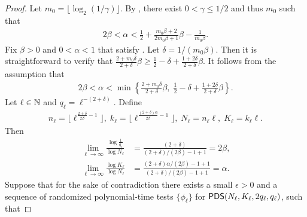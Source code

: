 	
	\begin{proof}
	  Let $m_0=\lfloor \log_2 (1/\gamma) \rfloor$.  By , there exist $0<\gamma \le 1/2$ and thus $m_0$ such that 
	     \begin{align}
    2\beta <\alpha <  \frac{1}{2} + \frac{m_0\beta+2}{2m_0\beta+1} \beta - \frac{1}{m_0 \beta}.   \label{eq:HardRegimeExpression}
    \end{align}
Fix $ \beta>0$ and $0<\alpha<1$ that satisfy . 
Let $\delta=1/(m_0 \beta)$. Then it is straightforward to verify that 
$\frac{2+m_0\delta }{2+\delta} \beta \ge \frac{1}{2}-\delta + \frac{1+2\delta}{2+\delta} \beta $.
It follows from the assumption  that
    \begin{align}
    2\beta <\alpha< \min \left \{  \frac{2+m_0\delta }{2+\delta} \beta, \; \frac{1}{2}-\delta + \frac{1+2\delta}{2+\delta} \beta \right\}.
    \label{eq:betaub}   
    \end{align}
Let $\ell \in {\mathbb{N}}$ and $q_\ell=\ell^{-(2+\delta)}$.
Define
    \begin{align}
     n_\ell= \lfloor \ell^{\frac{2+\delta}{2\beta}-1 } \rfloor, \; k_\ell=\lfloor \ell^{\frac{(2+\delta)\alpha}{2\beta}-1 } \rfloor,\; N_\ell=n_\ell\ell, \; K_\ell=k_\ell\ell. \label{eq:DefNK}
    \end{align}
Then
\begin{align}
\lim_{\ell \to \infty} \frac{\log \frac{1}{q_\ell} }{ \log N_\ell} & = \frac{(2+\delta)}{(2+\delta)/(2\beta)-1 +1 } =2\beta, \nonumber \\
\lim_{\ell \to \infty}  \frac{\log K_\ell}{ \log N_\ell}  & = \frac{(2+\delta)\alpha/(2\beta)-1 +1 }{(2+\delta)/(2\beta)-1 +1} = \alpha. \label{eq:NKq}
\end{align}
Suppose that for the sake of contradiction there exists a small $\epsilon>0$ and a sequence of randomized polynomial-time tests $\{\phi_\ell\}$ for ${\sf PDS}(N_\ell,K_\ell,2q_\ell,q_\ell)$, such that

\end{proof}
